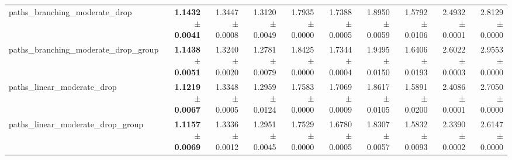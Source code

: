 \begin{tabular}{@{}lrrrrrrrrr@{}}
paths\_branching\_moderate\_drop & \textbf{1.1432 $\pm$ 0.0041} & 1.3447 $\pm$ 0.0008 & 1.3120 $\pm$ 0.0049 & 1.7935 $\pm$ 0.0000 & 1.7388 $\pm$ 0.0005 & 1.8950 $\pm$ 0.0059 & 1.5792 $\pm$ 0.0106 & 2.4932 $\pm$ 0.0001 & 2.8129 $\pm$ 0.0000 \\
paths\_branching\_moderate\_drop\_group & \textbf{1.1438 $\pm$ 0.0051} & 1.3240 $\pm$ 0.0020 & 1.2781 $\pm$ 0.0079 & 1.8425 $\pm$ 0.0000 & 1.7344 $\pm$ 0.0004 & 1.9495 $\pm$ 0.0150 & 1.6406 $\pm$ 0.0193 & 2.6022 $\pm$ 0.0003 & 2.9553 $\pm$ 0.0000 \\
paths\_linear\_moderate\_drop & \textbf{1.1219 $\pm$ 0.0067} & 1.3348 $\pm$ 0.0005 & 1.2959 $\pm$ 0.0124 & 1.7583 $\pm$ 0.0000 & 1.7069 $\pm$ 0.0009 & 1.8617 $\pm$ 0.0105 & 1.5891 $\pm$ 0.0200 & 2.4086 $\pm$ 0.0001 & 2.7050 $\pm$ 0.0000 \\
paths\_linear\_moderate\_drop\_group & \textbf{1.1157 $\pm$ 0.0069} & 1.3336 $\pm$ 0.0012 & 1.2951 $\pm$ 0.0045 & 1.7529 $\pm$ 0.0000 & 1.6780 $\pm$ 0.0005 & 1.8307 $\pm$ 0.0057 & 1.5832 $\pm$ 0.0093 & 2.3390 $\pm$ 0.0002 & 2.6147 $\pm$ 0.0000 \\
\bottomrule
\end{tabular}
